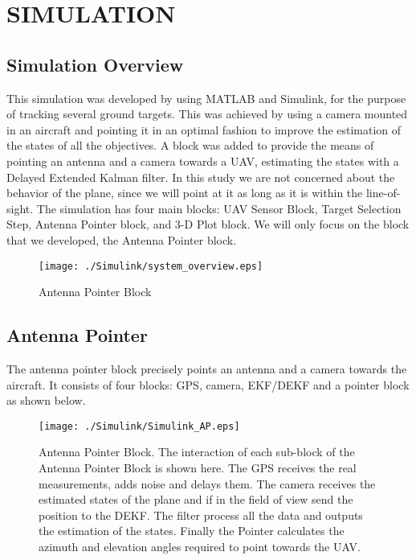 \chapter{SIMULATION}
\label{ch:simulation}

\section{Simulation Overview}
This simulation was developed by \cite{Sharma2013} using MATLAB and Simulink, for the purpose of tracking several ground targets. This was achieved by using a camera mounted in an aircraft and pointing it in an optimal fashion to improve the estimation of the states of all the objectives. A block was added to provide the means of pointing an antenna and a camera towards a UAV, estimating the states with a Delayed Extended Kalman filter. In this study we are not concerned about the behavior of the plane, since we will point at it as long as it is within the line-of-sight. The simulation has four main blocks: UAV Sensor Block, Target Selection Step, Antenna Pointer block, and 3-D Plot block. We will only focus on the block that we developed, the Antenna Pointer block.

\begin{figure}[h!]
  \texttt{[image: ./Simulink/system\_overview.eps]}
  \label{fig:system_overview}
  \caption[Antenna Pointer Block]{Antenna Pointer Block}
\end{figure}


\section{Antenna Pointer}
The antenna pointer block precisely points an antenna and a camera towards the aircraft. It consists of four blocks: GPS, camera, EKF/DEKF and a pointer block as shown below.
 
\begin{figure}[h!]
  \texttt{[image: ./Simulink/Simulink\_AP.eps]}
  \label{fig:AP}
  \caption[Antenna Pointer Block]{Antenna Pointer Block. The interaction of each sub-block of the Antenna Pointer Block is shown here. The GPS receives the real measurements, adds noise and delays them. The camera receives the estimated states of the plane and if in the field of view send the position to the DEKF. The filter process all the data and outputs the estimation of the states. Finally the Pointer calculates the azimuth and elevation angles required to point towards the UAV.}
\end{figure}

